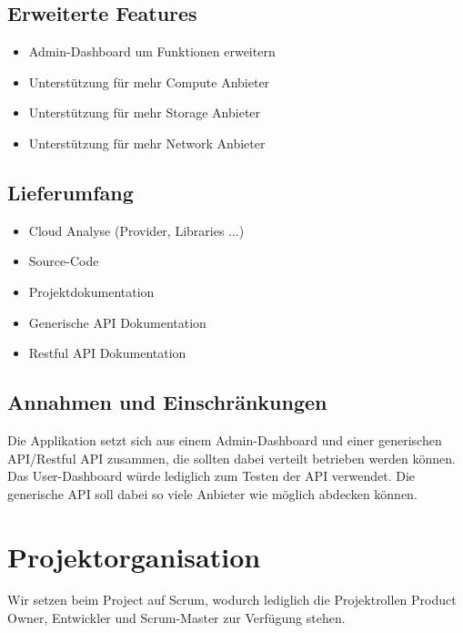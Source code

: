 \documentclass[11pt]{scrartcl}
\begin{document}
\subsection{Erweiterte Features}
\begin{itemize}
  \item Admin-Dashboard um Funktionen erweitern
  \item Unterstützung für mehr Compute Anbieter
  \item Unterstützung für mehr Storage Anbieter
  \item Unterstützung für mehr Network Anbieter
\end{itemize}
\subsection{Lieferumfang}
\begin{itemize}
  \item Cloud Analyse (Provider, Libraries ...)
  \item Source-Code
  \item Projektdokumentation
  \item Generische API Dokumentation
  \item Restful API Dokumentation
\end{itemize}

\subsection{Annahmen und Einschränkungen}
Die Applikation setzt sich aus einem Admin-Dashboard und einer generischen 
API/Restful API
zusammen, die sollten dabei verteilt betrieben werden können.
Das User-Dashboard würde lediglich zum Testen der API verwendet.
Die generische API soll dabei so viele Anbieter wie möglich abdecken können.
\section{Projektorganisation}
Wir setzen beim Project auf Scrum, wodurch lediglich die Projektrollen Product 
Owner, Entwickler und Scrum-Master zur Verfügung stehen.
\end{document}

